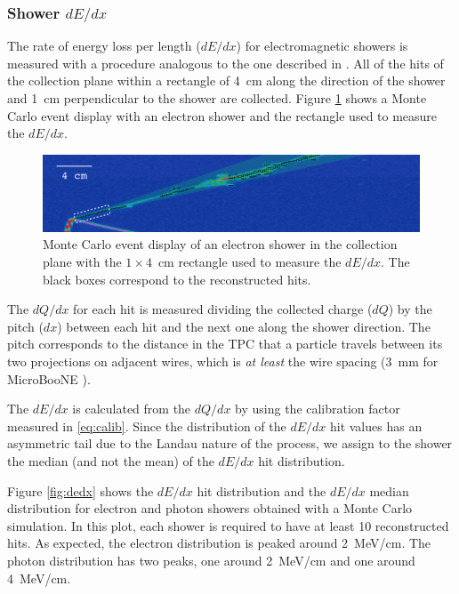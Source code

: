 \subsubsection{Shower \texorpdfstring{$dE/dx$}{dE/dx}}
The rate of energy loss per length ($dE/dx$) for electromagnetic showers is measured with a procedure analogous to the one described in \cite{argoneut}. All of the hits of the collection plane within a rectangle of 4~cm along the direction of the shower and 1~cm perpendicular to the shower are collected. Figure \ref{fig:evddedx} shows a Monte Carlo event display with an electron shower and the rectangle used to measure the $dE/dx$.

\begin{figure}[htbp]
\centering
  \includegraphics[width=0.9\linewidth]{figures/evddedx.png}
  \caption{Monte Carlo event display of an electron shower in the collection plane with the $1\times4$~cm rectangle used to measure the $dE/dx$. The black boxes correspond to the reconstructed hits.}
  \label{fig:evddedx}
\end{figure}

The $dQ/dx$ for each hit is measured dividing the collected charge ($dQ$) by the pitch ($dx$) between each hit and the next one along the shower direction. The pitch corresponds to the distance in the TPC that a particle travels between its two projections  on adjacent wires, which is \emph{at least} the wire spacing (3~mm for MicroBooNE \cite{detector}). 

The $dE/dx$ is calculated from the $dQ/dx$ by using the calibration factor measured in \eqref{eq:calib}.
Since the distribution of the $dE/dx$ hit values has an asymmetric tail due to the Landau nature of the process, we assign to the shower the median (and not the mean) of the $dE/dx$ hit distribution.

Figure \ref{fig:dedx} shows the $dE/dx$ hit distribution and the $dE/dx$ median distribution for electron and photon showers obtained with a Monte Carlo simulation. In this plot, each shower is required to have at least 10 reconstructed hits. As expected, the electron distribution is peaked around 2~MeV/cm. The photon distribution has two peaks, one around 2~MeV/cm and one around 4~MeV/cm. 



